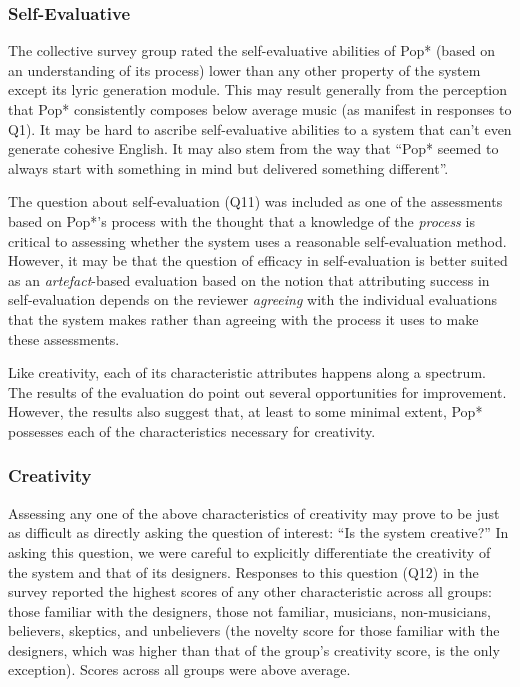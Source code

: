 \documentclass[phd,electronic,oneside,twosidetoc,letterpaper,chaptercenter,parttop,lol,lof,lot]{byumsphd}
\begin{document}
\subsubsection{Self-Evaluative}
The collective survey group rated the self-evaluative abilities of Pop* (based on an understanding of its process) lower than any other property of the system except its lyric generation module. This may result generally from the perception that Pop* consistently composes below average music (as manifest in responses to Q1). It may be hard to ascribe self-evaluative abilities to a system that can't even generate cohesive English. It may also stem from the way that ``Pop* seemed to always start with something in mind but delivered something different''.

The question about self-evaluation (Q11) was included as one of the assessments based on Pop*'s process with the thought that a knowledge of the \textit{process} is critical to assessing whether the system uses a reasonable self-evaluation method. However, it may be that the question of efficacy in self-evaluation is better suited as an \textit{artefact}-based evaluation based on the notion that attributing success in self-evaluation depends on the reviewer \textit{agreeing} with the individual evaluations that the system makes rather than agreeing with the process it uses to make these assessments. 
\newline

Like creativity, each of its characteristic attributes happens along a spectrum. The results of the evaluation do point out several opportunities for improvement. However, the results also suggest that, at least to some minimal extent, Pop* possesses each of the characteristics necessary for creativity.

\subsubsection{Creativity}

Assessing any one of the above characteristics of creativity may prove to be just as difficult as directly asking the question of interest: ``Is the system creative?'' In asking this question, we were careful to explicitly differentiate the creativity of the system and that of its designers. Responses to this question (Q12) in the survey reported the highest scores of any other characteristic across all groups: those familiar with the designers, those not familiar, musicians, non-musicians, believers, skeptics, and unbelievers (the novelty score for those familiar with the designers, which was higher than that of the group's creativity score, is the only exception). Scores across all groups were above average.
\end{document}
